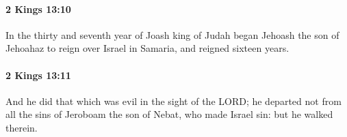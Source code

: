 		\paragraph{2 Kings 13:10} %
			\label{2KINGS-13-10}

			In the thirty and seventh year of Joash king of Judah began Jehoash the son of Jehoahaz to reign over Israel in Samaria, and reigned sixteen years.


		\paragraph{2 Kings 13:11} %
			\label{2KINGS-13-11}

			And he did that which was evil in the sight of the LORD; he departed not from all the sins of Jeroboam the son of Nebat, who made Israel sin: but he walked therein.


